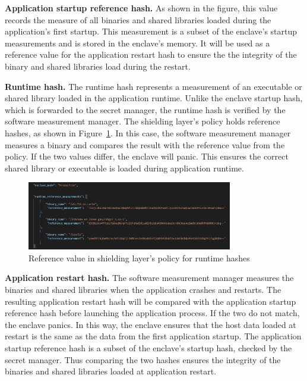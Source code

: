 \textbf{Application startup reference hash.} As shown in the figure, this value records the measure of all binaries and shared libraries loaded during the application's first startup. This measurement is a subset of the enclave's startup measurements and is stored in the enclave's memory. It will be used as a reference value for the application restart hash to ensure the 
the integrity of the binary and shared libraries load during the restart. 

\textbf{Runtime hash.} The runtime hash represents a measurement of an executable or shared library loaded in the application runtime. Unlike the enclave startup hash, which is forwarded to the secret manager, the runtime hash is verified by the software measurement manager. The shielding layer's policy holds reference hashes, as shown in Figure~\ref{fig:measurement}. In this case, 
the software measurement manager measures a binary and compares the result with the reference value from the policy. If the two values differ, the enclave will panic. This ensures the correct shared library or executable is loaded during application runtime.
\begin{figure}[!htb]
    \centering
    \includegraphics[width=0.8\textwidth]{images/measurement.png}
    \caption[Reference value in shielding layer's policy for runtime hashes]{Reference value in shielding layer's policy for runtime hashes}
    \label{fig:measurement}
\end{figure}

\textbf{Application restart hash.} The software measurement manager measures the binaries and shared libraries when the application crashes and restarts. The resulting application restart hash will be compared with the application startup reference hash before launching the application process. If the two do not match, the enclave panics. In this way, the enclave 
ensures that the host data loaded at restart is the same as the data from the first application startup. The application startup reference hash is a subset of the enclave's startup hash, checked by the secret manager. Thus comparing the two hashes ensures the integrity of the binaries and shared libraries loaded at application restart. 

